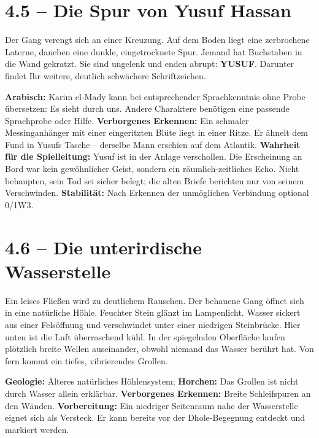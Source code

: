 \section{4.5 -- Die Spur von Yusuf Hassan}
\begin{vorlesetextalle}
Der Gang verengt sich an einer Kreuzung. Auf dem Boden liegt eine zerbrochene Laterne, daneben eine dunkle, eingetrocknete Spur. Jemand hat Buchstaben in die Wand gekratzt. Sie sind ungelenk und enden abrupt: \textbf{YUSUF}. Darunter findet Ihr weitere, deutlich schwächere Schriftzeichen.
\end{vorlesetextalle}
\begin{meisterinfo}
\textbf{Arabisch:} Karim el-Mady kann bei entsprechender Sprachkenntnis ohne Probe übersetzen: \glqq{}Es sieht durch uns.\grqq{} Andere Charaktere benötigen eine passende Sprachprobe oder Hilfe. \textbf{Verborgenes Erkennen:} Ein schmaler Messinganhänger mit einer eingeritzten Blüte liegt in einer Ritze. Er ähnelt dem Fund in Yusufs Tasche -- derselbe Mann erschien auf dem Atlantik. \textbf{Wahrheit für die Spielleitung:} Yusuf ist in der Anlage verschollen. Die Erscheinung an Bord war kein gewöhnlicher Geist, sondern ein räumlich-zeitliches Echo. Nicht behaupten, sein Tod sei sicher belegt; die alten Briefe berichten nur von seinem Verschwinden. \textbf{Stabilität:} Nach Erkennen der unmöglichen Verbindung optional 0/1W3.
\end{meisterinfo}
\section{4.6 -- Die unterirdische Wasserstelle}
\begin{vorlesetextalle}
Ein leises Flie\ss{}en wird zu deutlichem Rauschen. Der behauene Gang öffnet sich in eine natürliche Höhle. Feuchter Stein glänzt im Lampenlicht. Wasser sickert aus einer Felsöffnung und verschwindet unter einer niedrigen Steinbrücke. Hier unten ist die Luft überraschend kühl. In der spiegelnden Oberfläche laufen plötzlich breite Wellen auseinander, obwohl niemand das Wasser berührt hat. Von fern kommt ein tiefes, vibrierendes Grollen.
\end{vorlesetextalle}
\begin{meisterinfo}
\textbf{Geologie:} Älteres natürliches Höhlensystem; \textbf{Horchen:} Das Grollen ist nicht durch Wasser allein erklärbar. \textbf{Verborgenes Erkennen:} Breite Schleifspuren an den Wänden. \textbf{Vorbereitung:} Ein niedriger Seitenraum nahe der Wasserstelle eignet sich als Versteck. Er kann bereits vor der Dhole-Begegnung entdeckt und markiert werden.
\end{meisterinfo}
